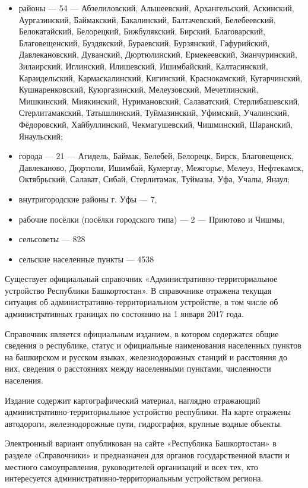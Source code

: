 \begin{itemize}
	\item районы — 54 — Абзелиловский, Альшеевский, Архангельский, Аскинский, Аургазинский, Баймакский, Бакалинский, Балтачевский, Белебеевский, Белокатайский, Белорецкий, Бижбулякский, Бирский, Благоварский, Благовещенский, Буздякский, Бураевский, Бурзянский, Гафурийский, Давлекановский, Дуванский, Дюртюлинский, Ермекеевский, Зианчуринский, Зилаирский, Иглинский, Илишевский, Ишимбайский, Калтасинский, Караидельский, Кармаскалинский, Кигинский, Краснокамский, Кугарчинский, Кушнаренковский, Куюргазинский, Мелеузовский, Мечетлинский, Мишкинский, Миякинский, Нуримановский, Салаватский, Стерлибашевский, Стерлитамакский, Татышлинский, Туймазинский, Уфимский, Учалинский, Фёдоровский, Хайбуллинский, Чекмагушевский, Чишминский, Шаранский, Янаульский;
	\item города — 21 — Агидель, Баймак, Белебей, Белорецк, Бирск, Благовещенск, Давлеканово, Дюртюли, Ишимбай, Кумертау, Межгорье, Мелеуз, Нефтекамск, Октябрьский, Салават, Сибай, Стерлитамак, Туймазы, Уфа, Учалы, Янаул;
	\item внутригородские районы г. Уфы — 7,
	\item рабочие посёлки (посёлки городского типа) — 2 — Приютово и Чишмы,
	\item сельсоветы — 828
	\item сельские населенные пункты — 4538
\end{itemize}

Существует официальный справочник «Административно-территориальное устройство Республики Башкортостан». В справочнике отражена текущая ситуация об административно-территориальном устройстве, в том числе об административных границах по состоянию на 1 января 2017 года.

Справочник является официальным изданием, в котором содержатся общие сведения о республике, статус и официальные наименования населенных пунктов на башкирском и русском языках, железнодорожных станций и расстояния до них, сведения о расстояниях между населенными пунктами, численности населения.

Издание содержит картографический материал, наглядно отражающий административно-территориальное устройство республики. На карте отражены автодороги, железнодорожные пути, гидрография, крупные водные объекты.

Электронный вариант опубликован на сайте «Республика Башкортостан» в разделе «Справочники» и предназначен для органов государственной власти и местного самоуправления, руководителей организаций и всех тех, кто интересуется административно-территориальным устройством региона.

